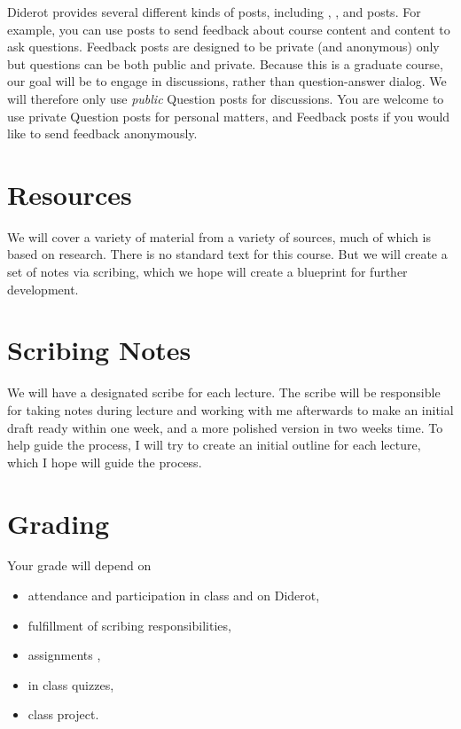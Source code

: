 Diderot provides several different kinds of posts, including , , and  posts.
%
For example, you can use  posts to send feedback about course content and  content to ask questions.
%
Feedback posts are designed to be private (and anonymous) only but questions can be both public and private.
%
Because this is a graduate course, our goal will be to engage in discussions, rather than question-answer dialog.
%
We will therefore only use \emph{public} Question posts for discussions.
%
You are welcome to use private Question posts for personal matters, and Feedback posts if you would like to send feedback anonymously. 


\section{Resources}

We will cover a variety of material from a variety of sources, much of which is based on research.
%
There is no standard text for this course.
%
But we will create a set of notes via scribing, which we hope will create a blueprint for further development.


\section{Scribing Notes}

We will have a  designated scribe for each lecture.
%
The scribe will be responsible for taking notes during lecture and working with me afterwards to make an initial draft ready within one week, and a more polished version in two weeks time.
%
To help guide the process, I will try to create an initial outline for each lecture, which I hope will guide the process.

\section{Grading}
Your grade will depend on 
\begin{itemize}
\item attendance and participation in class and on Diderot,
\item fulfillment of scribing responsibilities,
\item assignments ,
\item in class quizzes,
\item class project.
\end{itemize}


